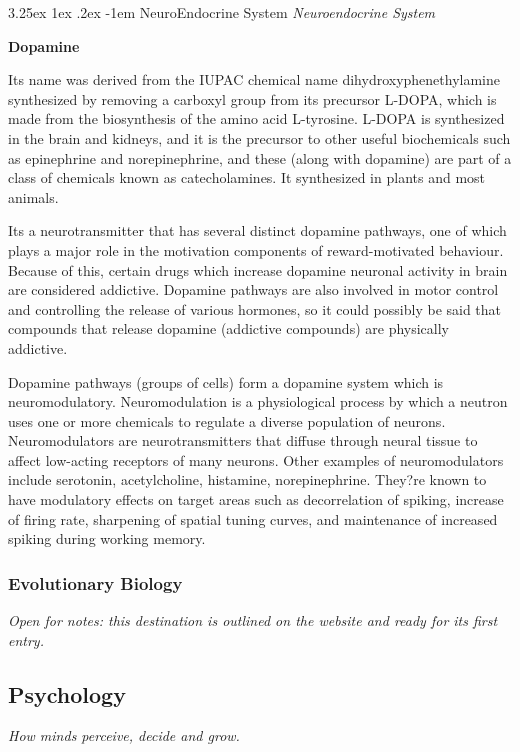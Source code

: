 \documentclass{article}
\makeatletter
\newcounter{subsubsubsection}[subsubsection]
\renewcommand\subparagraph{\@startsection{subparagraph}{6}{\parindent}%
  {3.25ex \@plus1ex \@minus .2ex}%
  {-1em}%
  {\normalfont\normalsize\bfseries}}
\makeatother
\begin{document}

\subparagraph{NeuroEndocrine System}
\textit{Neuroendocrine System}

\textbf{Dopamine}

Its name was derived from the IUPAC chemical name dihydroxyphenethylamine synthesized by removing a carboxyl group from its precursor L-DOPA, which is made from the biosynthesis of the amino acid L-tyrosine. L-DOPA is synthesized in the brain and kidneys, and it is the precursor to other useful biochemicals such as epinephrine and norepinephrine, and these (along with dopamine) are part of a class of chemicals known as catecholamines. It synthesized in plants and most animals. 

Its a neurotransmitter that has several distinct dopamine pathways, one of which plays a major role in the motivation components of reward-motivated behaviour. Because of this, certain drugs which increase dopamine neuronal activity in brain are considered addictive. Dopamine pathways are also involved in motor control and controlling the release of various hormones, so it could possibly be said that compounds that release dopamine (addictive compounds) are physically addictive. 

Dopamine pathways (groups of cells) form a dopamine system which is neuromodulatory. Neuromodulation is a physiological process by which a neutron uses one or more chemicals to regulate a diverse population of neurons. Neuromodulators are neurotransmitters that diffuse through neural tissue to affect low-acting receptors of many neurons. Other examples of neuromodulators include serotonin, acetylcholine, histamine, norepinephrine. They?re known to have modulatory effects on target areas such as decorrelation of spiking, increase of firing rate, sharpening of spatial tuning curves, and maintenance of increased spiking during working memory.

\subsubsection{Evolutionary Biology}\label{sec:evolutionary-biology}
\textit{Open for notes: this destination is outlined on the website and ready for its first entry.}

\subsection{Psychology}\label{sec:psychology}
\textit{How minds perceive, decide and grow.}
\end{document}
